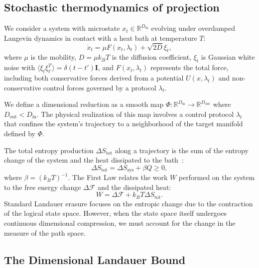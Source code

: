 \documentclass[aps,pre,twocolumn,superscriptaddress,floatfix]{revtex4-2}
\begin{document}
\subsection{Stochastic thermodynamics of projection}

We consider a system with microstate $x_t \in \mathbb{R}^{D_{\text{in}}}$ evolving under overdamped Langevin dynamics in contact with a heat bath at temperature $T$:
\begin{equation}
    \dot{x}_t = \mu F(x_t, \lambda_t) + \sqrt{2D} \xi_t,
    \label{eq:langevin}
\end{equation}
where $\mu$ is the mobility, $D = \mu k_B T$ is the diffusion coefficient, $\xi_t$ is Gaussian white noise with $\langle \xi_t \xi_{t'}^T \rangle = \delta(t-t')\mathbf{I}$, and $F(x_t, \lambda_t)$ represents the total force, including both conservative forces derived from a potential $U(x, \lambda_t)$ and non-conservative control forces governed by a protocol $\lambda_t$.

We define a dimensional reduction as a smooth map $\Phi: \mathbb{R}^{D_{\text{in}}} \to \mathbb{R}^{D_{\text{out}}}$ where $D_{\text{out}} < D_{\text{in}}$. The physical realization of this map involves a control protocol $\lambda_t$ that confines the system's trajectory to a neighborhood of the target manifold defined by $\Phi$.

The total entropy production $\Delta S_{\text{tot}}$ along a trajectory is the sum of the entropy change of the system and the heat dissipated to the bath~\cite{seifert2012}:
\begin{equation}
    \Delta S_{\text{tot}} = \Delta S_{\text{sys}} + \beta Q \ge 0,
\end{equation}
where $\beta = (k_B T)^{-1}$. The First Law relates the work $W$ performed on the system to the free energy change $\Delta \mathcal{F}$ and the dissipated heat:
\begin{equation}
    W = \Delta \mathcal{F} + k_B T \Delta S_{\text{tot}}.
    \label{eq:work_relation}
\end{equation}
Standard Landauer erasure focuses on the entropic change due to the contraction of the logical state space. However, when the state space itself undergoes continuous dimensional compression, we must account for the change in the measure of the path space.

\subsection{The Dimensional Landauer Bound}
\end{document}
